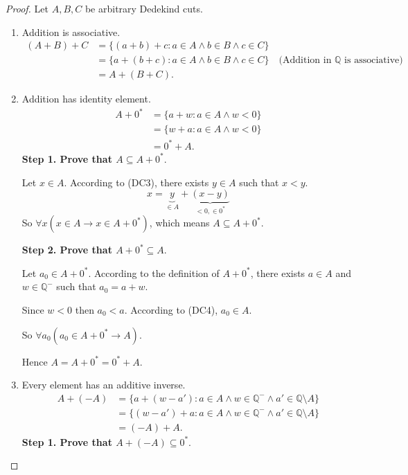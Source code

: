 \begin{proof}
    Let $A, B, C$ be arbitrary Dedekind cuts.
    \begin{enumerate}[label = (F\arabic*)]
        \item Addition is associative.
              \begin{align*}
                  (A + B) + C & = \{ (a + b) + c : a\in A\land b\in B\land c\in C \}                                                       \\
                              & = \{ a + (b + c) : a\in A\land b\in B\land c\in C \} \quad\text{(Addition in $\mathbb{Q}$ is associative)} \\
                              & = A + (B + C).
              \end{align*}
        \item Addition has identity element.
              \begin{align*}
                  A + {0}^{*} & = \{ a + w : a\in A\land w < 0 \} \\
                              & = \{ w + a : a\in A\land w < 0 \} \\
                              & = {0}^{*} + A.
              \end{align*}
              \textbf{Step 1. Prove that $A \subseteq A + {0}^{*}$}.

              Let $x\in A$. According to (DC3), there exists $y\in A$ such that $x < y$.
              \[
                  x = \underbrace{y}_{\in A} + \underbrace{(x - y)}_{< 0, \in {0}^{*}}
              \]
              So $\forall x(x\in A \rightarrow x\in A + {0}^{*})$, which means $A \subseteq A + {0}^{*}$.
              \bigskip

              \textbf{Step 2. Prove that $A + {0}^{*} \subseteq A$}.

              Let $a_{0}\in A + {0^{*}}$. According to the definition of $A + {0}^{*}$, there exists $a\in A$ and $w\in\mathbb{Q}^{-}$ such that $a_{0} = a + w$.

              Since $w < 0$ then $a_{0} < a$. According to (DC4), $a_{0}\in A$.

              So $\forall a_{0}(a_{0}\in A + {0}^{*} \rightarrow A)$.

              Hence $A = A + {0}^{*} = {0}^{*} + A$.
        \item Every element has an additive inverse.
              \begin{align*}
                  A + (-A) & = \{ a + (w - a') : a\in A\land w\in\mathbb{Q}^{-}\land a'\in\mathbb{Q}\setminus A \} \\
                           & = \{ (w - a') + a : a\in A\land w\in\mathbb{Q}^{-}\land a'\in\mathbb{Q}\setminus A \} \\
                           & = (-A) + A.
              \end{align*}
              \textbf{Step 1. Prove that $A + (-A)\subseteq {0}^{*}$}.


\end{enumerate}
\end{proof}
